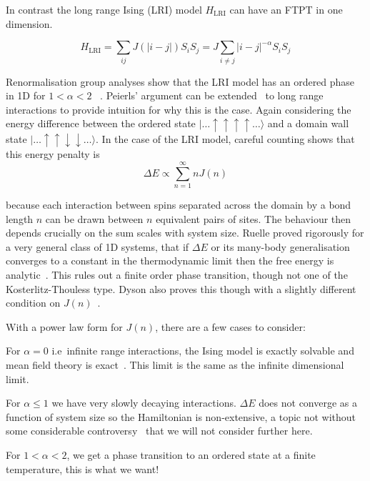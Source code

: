 In contrast the long range Ising (LRI) model \(H_{\mathrm{LRI}}\) can have an FTPT in one dimension.

\[H_{\mathrm{LRI}} = \sum_{ij} J(|i-j|) S_i S_j = J \sum_{i\neq j} |i - j|^{-\alpha} S_i S_j\]

Renormalisation group analyses show that the LRI model has an ordered phase in 1D for \(1 < \alpha < 2\) ~\autocite{dysonExistencePhasetransitionOnedimensional1969}. Peierls' argument can be extended~\autocite{thoulessLongRangeOrderOneDimensional1969} to long range interactions to provide intuition for why this is the case. Again considering the energy difference between the ordered state \(|\ldots\uparrow\uparrow\uparrow\uparrow\ldots\rangle\) and a domain wall state \(|\ldots\uparrow\uparrow\downarrow\downarrow\ldots\rangle\). In the case of the LRI model, careful counting shows that this energy penalty is \[\Delta E \propto \sum_{n=1}^{\infty} n J(n)\]

because each interaction between spins separated across the domain by a bond length \(n\) can be drawn between \(n\) equivalent pairs of sites. The behaviour then depends crucially on the sum scales with system size. Ruelle proved rigorously for a very general class of 1D systems, that if \(\Delta E\) or its many-body generalisation converges to a constant in the thermodynamic limit then the free energy is analytic~\autocite{ruelleStatisticalMechanicsOnedimensional1968}. This rules out a finite order phase transition, though not one of the Kosterlitz-Thouless type. Dyson also proves this though with a slightly different condition on \(J(n)\)~\autocite{dysonExistencePhasetransitionOnedimensional1969}.

With a power law form for \(J(n)\), there are a few cases to consider:

For \(\alpha = 0\) i.e~infinite range interactions, the Ising model is exactly solvable and mean field theory is exact~\autocite{lipkinValidityManybodyApproximation1965}. This limit is the same as the infinite dimensional limit.

For \(\alpha \leq 1\) we have very slowly decaying interactions. \(\Delta E\) does not converge as a function of system size so the Hamiltonian is non-extensive, a topic not without some considerable controversy~\autocite{grossNonextensiveHamiltonianSystems2002,lutskoQuestioningValidityNonextensive2011,wangCommentNonextensiveHamiltonian2003} that we will not consider further here.

For \(1 < \alpha < 2\), we get a phase transition to an ordered state at a finite temperature, this is what we want!

